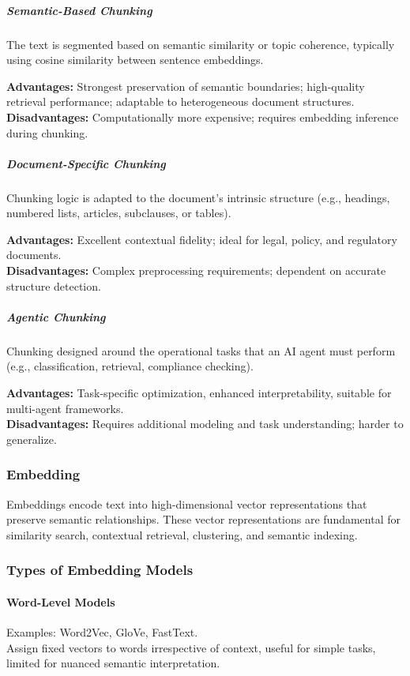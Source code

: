 \documentclass[12pt,a4paper]{article}
\begin{document}
\subparagraph{Semantic-Based Chunking}
The text is segmented based on semantic similarity or topic coherence, typically using cosine similarity between sentence embeddings.

\textbf{Advantages:} Strongest preservation of semantic boundaries; high-quality retrieval performance; adaptable to heterogeneous document structures.\\  
\textbf{Disadvantages:} Computationally more expensive; requires embedding inference during chunking.

\subparagraph{Document-Specific Chunking}
Chunking logic is adapted to the document’s intrinsic structure (e.g., headings, numbered lists, articles, subclauses, or tables).

\textbf{Advantages:} Excellent contextual fidelity; ideal for legal, policy, and regulatory documents.\\  
\textbf{Disadvantages:} Complex preprocessing requirements; dependent on accurate structure detection.

\subparagraph{Agentic Chunking}
Chunking designed around the operational tasks that an AI agent must perform (e.g., classification, retrieval, compliance checking).

\textbf{Advantages:} Task-specific optimization, enhanced interpretability, suitable for multi-agent frameworks.\\  
\textbf{Disadvantages:} Requires additional modeling and task understanding; harder to generalize.

\subsubsection{Embedding}
Embeddings encode text into high-dimensional vector representations that preserve semantic relationships. These vector representations are fundamental for similarity search, contextual retrieval, clustering, and semantic indexing.

\subsubsection*{Types of Embedding Models}

\paragraph{Word-Level Models}
Examples: Word2Vec, GloVe, FastText.\\  
Assign fixed vectors to words irrespective of context, useful for simple tasks, limited for nuanced semantic interpretation.
\end{document}
